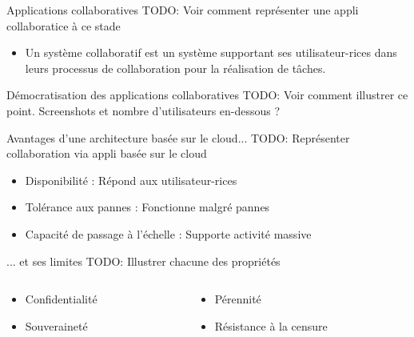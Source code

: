 \begin{frame}{Applications collaboratives}
    TODO: Voir comment représenter une appli collaboratice à ce stade
    \begin{itemize}
        \item Un \alert{système collaboratif} est un système supportant ses utilisateur-rices dans leurs processus de collaboration pour la réalisation de tâches.
    \end{itemize}
\end{frame}

\begin{frame}{Démocratisation des applications collaboratives}
    TODO: Voir comment illustrer ce point.
    Screenshots et nombre d'utilisateurs en-dessous ?
\end{frame}

\begin{frame}{Avantages d'une architecture basée sur le cloud...}
    TODO: Représenter collaboration via appli basée sur le cloud
    \begin{itemize}
        \item \alert{Disponibilité} : Répond aux utilisateur-rices
        \item \alert{Tolérance aux pannes} : Fonctionne malgré pannes
        \item \alert{Capacité de passage à l'échelle} : Supporte activité massive
    \end{itemize}
\end{frame}

\begin{frame}{... et ses limites}
    TODO: Illustrer chacune des propriétés
    \begin{columns}
        \begin{column}{0.5\textwidth}
            \begin{itemize}
                \item Confidentialité
                \item Souveraineté
            \end{itemize}
        \end{column}
        \begin{column}{0.5\textwidth}
            \begin{itemize}
                \item Pérennité
                \item Résistance à la censure
            \end{itemize}
        \end{column}
    \end{columns}
\end{frame}

